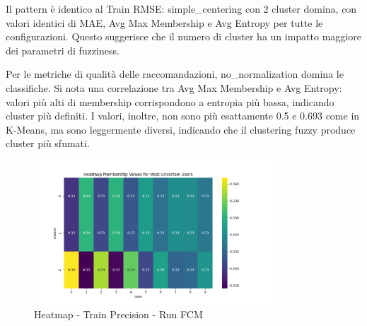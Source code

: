 Il pattern è identico al Train RMSE: simple\_centering con 2 cluster domina, con valori identici di MAE, Avg Max Membership e Avg Entropy per tutte le configurazioni. Questo suggerisce che il numero di cluster ha un impatto maggiore dei parametri di fuzziness.

\begin{table}[H]
  \centering
  \caption{Top 5 Configurazioni per Train Precision - Run FCM}
\end{table}

Per le metriche di qualità delle raccomandazioni, no\_normalization domina le classifiche. Si nota una correlazione tra Avg Max Membership e Avg Entropy: valori più alti di membership corrispondono a entropia più bassa, indicando cluster più definiti. I valori, inoltre, non sono più esattamente 0.5 e 0.693 come in K-Means, ma sono leggermente diversi, indicando che il clustering fuzzy produce cluster più sfumati.

\begin{figure}[H]
  \centering
  \includegraphics[width=0.8\textwidth]{../output/run_fcm/images/normalization/no_normalization/membership_heatmap/membership_heatmap_c3_m1.2_fcm_cog_pearson.png}
  \caption{Heatmap - Train Precision - Run FCM}
  \label{fig:train_precision_fcm}
\end{figure}

